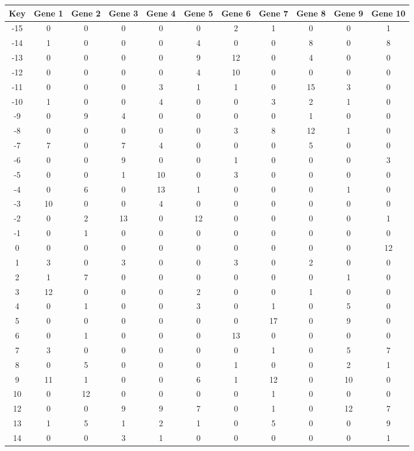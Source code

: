 \begin{tabular}{|c|c|c|c|c|c|c|c|c|c|c|}
\hline
Key & Gene 1 & Gene 2 & Gene 3 & Gene 4 & Gene 5 & Gene 6 & Gene 7 & Gene 8 & Gene 9 & Gene 10 \\
\hline
-15 & 0 & 0 & 0 & 0 & 0 & 2 & 1 & 0 & 0 & 1 \\
-14 & 1 & 0 & 0 & 0 & 4 & 0 & 0 & 8 & 0 & 8 \\
-13 & 0 & 0 & 0 & 0 & 9 & 12 & 0 & 4 & 0 & 0 \\
-12 & 0 & 0 & 0 & 0 & 4 & 10 & 0 & 0 & 0 & 0 \\
-11 & 0 & 0 & 0 & 3 & 1 & 1 & 0 & 15 & 3 & 0 \\
-10 & 1 & 0 & 0 & 4 & 0 & 0 & 3 & 2 & 1 & 0 \\
-9 & 0 & 9 & 4 & 0 & 0 & 0 & 0 & 1 & 0 & 0 \\
-8 & 0 & 0 & 0 & 0 & 0 & 3 & 8 & 12 & 1 & 0 \\
-7 & 7 & 0 & 7 & 4 & 0 & 0 & 0 & 5 & 0 & 0 \\
-6 & 0 & 0 & 9 & 0 & 0 & 1 & 0 & 0 & 0 & 3 \\
-5 & 0 & 0 & 1 & 10 & 0 & 3 & 0 & 0 & 0 & 0 \\
-4 & 0 & 6 & 0 & 13 & 1 & 0 & 0 & 0 & 1 & 0 \\
-3 & 10 & 0 & 0 & 4 & 0 & 0 & 0 & 0 & 0 & 0 \\
-2 & 0 & 2 & 13 & 0 & 12 & 0 & 0 & 0 & 0 & 1 \\
-1 & 0 & 1 & 0 & 0 & 0 & 0 & 0 & 0 & 0 & 0 \\
0 & 0 & 0 & 0 & 0 & 0 & 0 & 0 & 0 & 0 & 12 \\
1 & 3 & 0 & 3 & 0 & 0 & 3 & 0 & 2 & 0 & 0 \\
2 & 1 & 7 & 0 & 0 & 0 & 0 & 0 & 0 & 1 & 0 \\
3 & 12 & 0 & 0 & 0 & 2 & 0 & 0 & 1 & 0 & 0 \\
4 & 0 & 1 & 0 & 0 & 3 & 0 & 1 & 0 & 5 & 0 \\
5 & 0 & 0 & 0 & 0 & 0 & 0 & 17 & 0 & 9 & 0 \\
6 & 0 & 1 & 0 & 0 & 0 & 13 & 0 & 0 & 0 & 0 \\
7 & 3 & 0 & 0 & 0 & 0 & 0 & 1 & 0 & 5 & 7 \\
8 & 0 & 5 & 0 & 0 & 0 & 1 & 0 & 0 & 2 & 1 \\
9 & 11 & 1 & 0 & 0 & 6 & 1 & 12 & 0 & 10 & 0 \\
10 & 0 & 12 & 0 & 0 & 0 & 0 & 1 & 0 & 0 & 0 \\
12 & 0 & 0 & 9 & 9 & 7 & 0 & 1 & 0 & 12 & 7 \\
13 & 1 & 5 & 1 & 2 & 1 & 0 & 5 & 0 & 0 & 9 \\
14 & 0 & 0 & 3 & 1 & 0 & 0 & 0 & 0 & 0 & 1 \\
\hline
\end{tabular}